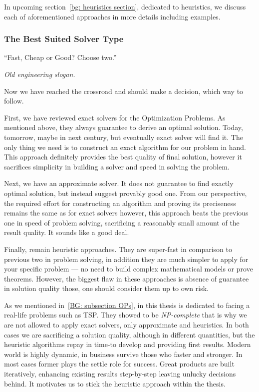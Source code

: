 In upcoming section~\ref{bg: heuristics section}, dedicated to heuristics, we discuss each of aforementioned approaches in more details including examples.


\subsubsection{The Best Suited Solver Type}
\epigraph{``Fast, Cheap or Good? Choose two.''}{\textit{Old engineering slogan.}}

Now we have reached the crossroad and should make a decision, which way to follow.

First, we have reviewed exact solvers for the Optimization Problems. As mentioned above, they always guarantee to derive an optimal solution. Today, tomorrow, maybe in next century, but eventually exact solver will find it. The only thing we need is to construct an exact algorithm for our problem in hand. This approach definitely provides the best quality of final solution, however it sacrifices simplicity in building a solver and speed in solving the problem.

Next, we have an approximate solver. It does not guarantee to find exactly optimal solution, but instead suggest provably good one. From our perspective, the required effort for constructing an algorithm and proving its preciseness remains the same as for exact solvers however, this approach beats the previous one in speed of problem solving, sacrificing a reasonably small amount of the result quality. It sounds like a good deal.

Finally, remain heuristic approaches. They are super-fast in comparison to previous two in problem solving, in addition they are much simpler to apply for your specific problem — no need to build complex mathematical models or prove theorems. However, the biggest flaw in these approaches is absence of guarantee in solution quality those, one should consider them up to own risk.


As we mentioned in~\ref{BG: subsection OPs}, in this thesis is dedicated to facing a real-life problems such as TSP. They showed to be \textit{NP-complete} that is why we are not allowed to apply exact solvers, only approximate and heuristics. In both cases we are sacrificing a solution quality, although in different quantities, but the heuristic algorithms repay in time-to develop and providing first results. Modern world is highly dynamic, in business survive those who faster and stronger. In most cases former plays the settle role for success. Great products are built iteratively, enhancing existing results step-by-step leaving unlucky decisions behind. It motivates us to stick the heuristic approach within the thesis.

